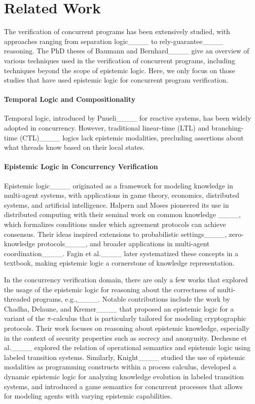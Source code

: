 \section{Related Work}
The verification of concurrent programs has been extensively studied, with approaches ranging from separation logic____ to rely-guarantee____ reasoning.
The PhD theses of Baumann and Bernhard____ give
an overview of various techniques used in the verification of concurrent programs, including techniques beyond the scope of epistemic logic.  
Here, we only focus on those studies that have used epistemic logic for concurrent program verification.

\paragraph{Temporal Logic and Compositionality}
Temporal logic, introduced by Pnueli____ for reactive systems, has been widely adopted in concurrency. However, traditional linear-time (LTL) and branching-time (CTL)____ logics lack epistemic modalities, precluding assertions about what threads know based on their local states. 

\paragraph{Epistemic Logic in Concurrency Verification}
Epistemic logic____ originated as a framework for modeling knowledge in multi-agent systems, with applications in game theory, economics, distributed systems, and artificial intelligence. Halpern and Moses pioneered its use in distributed computing with their seminal work on common knowledge ____, which formalizes conditions under which agreement protocols can achieve consensus. Their ideas inspired extensions to probabilistic settings____, zero-knowledge protocols____, and broader applications in multi-agent coordination____. Fagin et al.____ later systematized these concepts in a textbook, making epistemic logic a cornerstone of knowledge representation.

In the concurrency verification domain, there are only a few works that explored the usage of the epistemic logic for reasoning about the correctness of multi-threaded programs, e.g.,____. Notable contributions include the work by Chadha, Delaune, and Kremer____ that proposed an epistemic logic for a variant of the $\pi$-calculus that is particularly tailored for modeling cryptographic protocols. Their work focuses on reasoning about epistemic knowledge, especially in the context of security properties such as secrecy and anonymity. Dechesne et al.____ explored the relation of operational semantics and epistemic logic using labeled transition systems. Similarly, Knight____ studied the use of epistemic modalities as programming constructs within a process calculus, developed a dynamic epistemic logic for analyzing knowledge evolution in labeled transition systems, and introduced a game semantics for concurrent processes that allows for modeling agents with varying epistemic capabilities.

